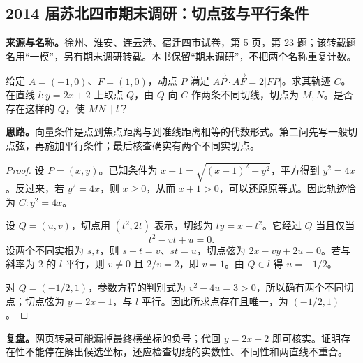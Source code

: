 \documentclass[UTF8]{ctexart}
\begin{document}
\subsection{2014 届苏北四市期末调研：切点弦与平行条件}\label{sec:c2014sb}
\textbf{来源与名称。}\href{https://doc.xuehai.net/b24b27f9a1f1345ca980b6ebe-5.html}{徐州、淮安、连云港、宿迁四市试卷，第 5 页}，第 23 题；该转载题名用“一模”，另有\href{https://www.mianfeiwendang.com/doc/e71df5c172c3e51967676141}{期末调研转载}。本书保留“期末调研”，不把两个名称重复计数。
\begin{example}[题意]
给定 $A=(-1,0)$、$F=(1,0)$，动点 $P$ 满足 $\overrightarrow{AP}\cdot\overrightarrow{AF}=2|FP|$。求其轨迹 $C$。在直线 $l:y=2x+2$ 上取点 $Q$，由 $Q$ 向 $C$ 作两条不同切线，切点为 $M,N$。是否存在这样的 $Q$，使 $MN\parallel l$？
\end{example}
\textbf{思路。}向量条件是点到焦点距离与到准线距离相等的代数形式。第二问先写一般切点弦，再施加平行条件；最后核查确实有两个不同实切点。
\begin{proof}
设 $P=(x,y)$。已知条件为 $x+1=\sqrt{(x-1)^2+y^2}$，平方得到 $y^2=4x$。反过来，若 $y^2=4x$，则 $x\geq0$，从而 $x+1>0$，可以还原原等式。因此轨迹恰为 $C:y^2=4x$。

设 $Q=(u,v)$，切点用 $(t^2,2t)$ 表示，切线为 $ty=x+t^2$。它经过 $Q$ 当且仅当
\[
t^2-vt+u=0.
\]
设两个不同实根为 $s,t$，则 $s+t=v$、$st=u$，切点弦为 $2x-vy+2u=0$。若与斜率为 $2$ 的 $l$ 平行，则 $v\ne0$ 且 $2/v=2$，即 $v=1$。由 $Q\in l$ 得 $u=-1/2$。

对 $Q=(-1/2,1)$，参数方程的判别式为 $v^2-4u=3>0$，所以确有两个不同切点；切点弦为 $y=2x-1$，与 $l$ 平行。因此所求点存在且唯一，为 $(-1/2,1)$。
\end{proof}
\textbf{复盘。}网页转录可能漏掉最终横坐标的负号；代回 $y=2x+2$ 即可核实。证明存在性不能停在解出候选坐标，还应检查切线的实数性、不同性和两直线不重合。
\end{document}
